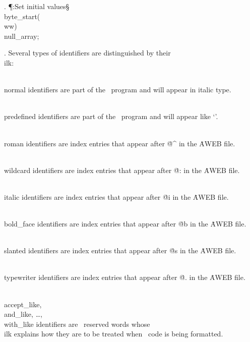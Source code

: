 . \P\?:Set initial values\X\mathrel{+}\S\?\6
\\{byte\_start}\?\1(\?\to\?\\{ww}\?\2)\K\?\\{null\_array};\par
\fi

. Several types of identifiers are distinguished by their \\{ilk}:

\yskip\hang \\{normal} identifiers are part of the \ADA\ program and
will appear in italic type.

\yskip\hang \\{predefined} identifiers are part of the \ADA\ program and
will appear like `'.

\yskip\hang \\{roman} identifiers are index entries that appear after
\.{@\^} in the \.{AWEB} file.

\yskip\hang \\{wildcard} identifiers are index entries that appear after
\.{@:} in the \.{AWEB} file.

\yskip\hang \\{italic} identifiers are index entries that appear after
\.{@i} in the \.{AWEB} file.

\yskip\hang \\{bold\_face} identifiers are index entries that appear after
\.{@b} in the \.{AWEB} file.

\yskip\hang \\{slanted} identifiers are index entries that appear after
\.{@s} in the \.{AWEB} file.

\yskip\hang \\{typewriter} identifiers are index entries that appear after
\.{@.} in the \.{AWEB} file.

\yskip\hang \\{accept\_like}, \\{and\_like}, \dots, \\{with\_like}
identifiers are \ADA\ reserved words whose \\{ilk} explains how they are
to be treated when \ADA\ code is being formatted.

